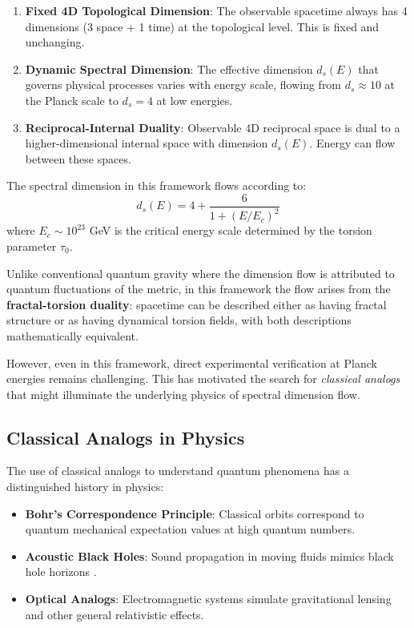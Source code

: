 \documentclass[UTF8]{ctex}\n\documentclass[12pt,a4paper]{article}
\begin{document}
\begin{enumerate}
    \item \textbf{Fixed 4D Topological Dimension}: The observable spacetime always has 4 dimensions (3 space + 1 time) at the topological level. This is fixed and unchanging.
    \item \textbf{Dynamic Spectral Dimension}: The effective dimension $d_s(E)$ that governs physical processes varies with energy scale, flowing from $d_s \approx 10$ at the Planck scale to $d_s = 4$ at low energies.
    \item \textbf{Reciprocal-Internal Duality}: Observable 4D reciprocal space is dual to a higher-dimensional internal space with dimension $d_s(E)$. Energy can flow between these spaces.
\end{enumerate}

The spectral dimension in this framework flows according to:
\begin{equation}
    d_s(E) = 4 + \frac{6}{1+(E/E_c)^2}
\end{equation}
where $E_c \sim 10^{23}$ GeV is the critical energy scale determined by the torsion parameter $\tau_0$.

Unlike conventional quantum gravity where the dimension flow is attributed to quantum fluctuations of the metric, in this framework the flow arises from the \textbf{fractal-torsion duality}: spacetime can be described either as having fractal structure or as having dynamical torsion fields, with both descriptions mathematically equivalent.

However, even in this framework, direct experimental verification at Planck energies remains challenging. This has motivated the search for \textit{classical analogs} that might illuminate the underlying physics of spectral dimension flow.

\subsection{Classical Analogs in Physics}

The use of classical analogs to understand quantum phenomena has a distinguished history in physics:

\begin{itemize}
    \item \textbf{Bohr's Correspondence Principle}: Classical orbits correspond to quantum mechanical expectation values at high quantum numbers.
    \item \textbf{Acoustic Black Holes}: Sound propagation in moving fluids mimics black hole horizons \cite{unruh1981}.
    \item \textbf{Optical Analogs}: Electromagnetic systems simulate gravitational lensing and other general relativistic effects.
\end{itemize}
\end{document}
